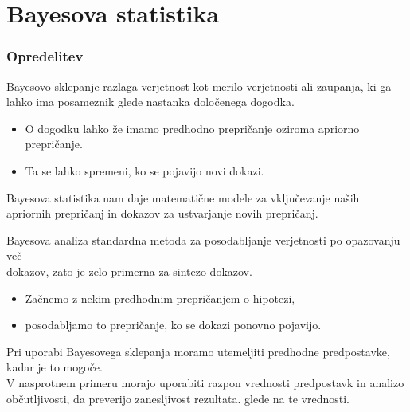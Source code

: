 \documentclass{beamer}
\begin{document}
\section{Bayesova statistika}

\begin{frame}
    \frametitle{Opredelitev}
    Bayesovo sklepanje razlaga verjetnost kot merilo verjetnosti ali zaupanja, ki ga lahko ima posameznik glede nastanka določenega dogodka.
    \begin{itemize}
      \item O dogodku lahko že imamo predhodno prepričanje oziroma apriorno prepričanje.
      \item Ta se lahko spremeni, ko se pojavijo novi dokazi.
    \end{itemize} \vspace{3mm}
    Bayesova statistika nam daje matematične modele za vključevanje naših apriornih prepričanj in dokazov za ustvarjanje novih prepričanj.
\end{frame}

\begin{frame}
    \begin{beamerboxesrounded}[]{Bayesova analiza}
        standardna metoda za posodabljanje verjetnosti po opazovanju več \\ dokazov, zato je zelo primerna za sintezo dokazov.
    \end{beamerboxesrounded}\vspace{3mm}
    \begin{itemize}
        \item Začnemo z nekim predhodnim prepričanjem o hipotezi,
        \item posodabljamo to prepričanje, ko se dokazi ponovno pojavijo.
    \end{itemize}\vspace{3mm}
    Pri uporabi Bayesovega sklepanja moramo utemeljiti predhodne predpostavke, kadar je to mogoče.  \\
    V nasprotnem primeru morajo uporabiti razpon vrednosti predpostavk in analizo občutljivosti, da preverijo zanesljivost rezultata.
glede na te vrednosti.
\end{frame}
\end{document}
